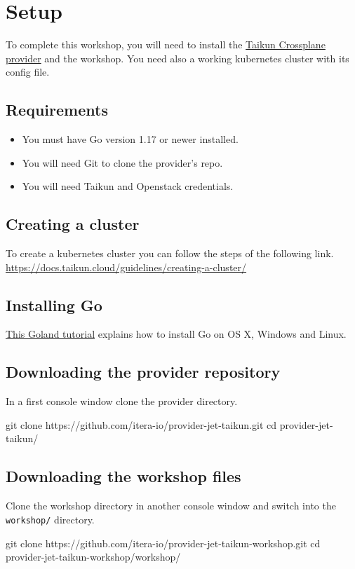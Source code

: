 \section{Setup}\label{sec:setup}

To complete this workshop, you will need to install the 
\href{https://github.com/itera-io/provider-jet-taikun}{Taikun Crossplane provider} 
and the workshop. You need also a working kubernetes cluster with its config file.

\subsection{Requirements}
\begin{itemize}
  \item You must have Go version 1.17 or newer installed.
  \item You will need Git to clone the provider's repo.
  \item You will need Taikun and Openstack credentials.
\end{itemize}

\subsection{Creating a cluster}
To create a kubernetes cluster you can follow the steps of the following link.
\href{https://docs.taikun.cloud/guidelines/creating-a-cluster/}{https://docs.taikun.cloud/guidelines/creating-a-cluster/}

\subsection{Installing Go}
\href{https://go.dev/doc/install}{This Goland tutorial}
explains how to install Go on OS X, Windows and Linux.

\subsection{Downloading the provider repository}
In a first console window clone the provider directory.
\begin{shell}
git clone https://github.com/itera-io/provider-jet-taikun.git
cd provider-jet-taikun/    
\end{shell}


\subsection{Downloading the workshop files}
Clone the workshop directory in another console window and switch into 
the \texttt{workshop/} directory.
\begin{shell}
git clone https://github.com/itera-io/provider-jet-taikun-workshop.git
cd provider-jet-taikun-workshop/workshop/
\end{shell}
